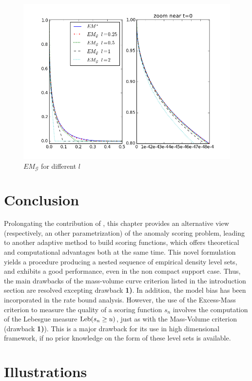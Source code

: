 \begin{figure}[!ht]
\includegraphics[width=\linewidth]{fig_source/EMG-EM.png}
\caption{$EM_\mathcal{G}$ for different $l$} %
\label{aistat:EMGEM}
\end{figure}


\section{Conclusion}
Prolongating the contribution of \cite{CLEM13}, this chapter provides an alternative view (respectively, an other parametrization) of the anomaly scoring problem, leading to another adaptive method to build scoring functions, which offers theoretical and computational advantages both at the same time. This novel formulation yields a procedure producing a nested sequence of empirical density level sets, and exhibits a good performance, even in the non compact support case. 
Thus, the main drawbacks of the mass-volume curve criterion listed in the introduction section are resolved excepting drawback \textbf{1)}. In addition, the model bias has been incorporated in the rate bound analysis.
%
However, the use of the Excess-Mass criterion to measure the quality of a scoring function $s_n$ involves the computation of the Lebesgue measure  $\text{Leb}(s_n \ge u)$, just as with the Mass-Volume criterion (drawback \textbf{1)}). This is a major drawback for its use in high dimensional framework, if no prior knowledge on the form of these level sets is available.


\section{Illustrations}

